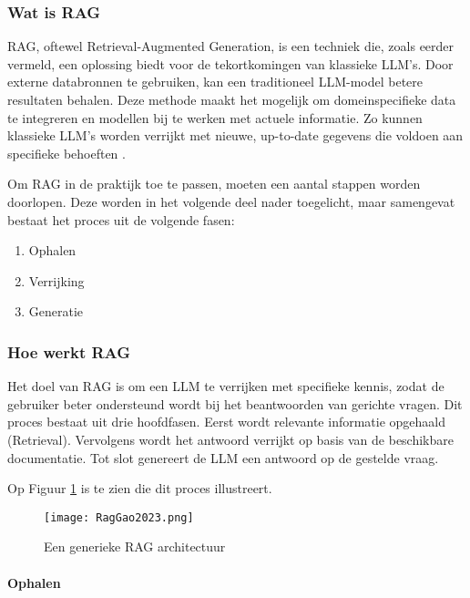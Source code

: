     \subsubsection{Wat is RAG}
    RAG, oftewel Retrieval-Augmented Generation, is een techniek die, zoals eerder vermeld, een oplossing biedt voor de tekortkomingen van klassieke LLM’s. Door externe databronnen te gebruiken, kan een traditioneel LLM-model betere resultaten behalen. Deze methode maakt het mogelijk om domeinspecifieke data te integreren en modellen bij te werken met actuele informatie. Zo kunnen klassieke LLM’s worden verrijkt met nieuwe, up-to-date gegevens die voldoen aan specifieke behoeften \autocite{Wu2024}.
    
    Om RAG in de praktijk toe te passen, moeten een aantal stappen worden doorlopen. Deze worden in het volgende deel nader toegelicht, maar samengevat bestaat het proces uit de volgende fasen:
    
    \begin{enumerate}
        \item {Ophalen}
        \item {Verrijking}
        \item {Generatie}
    \end{enumerate}
    
    \subsubsection{Hoe werkt RAG}
    
    Het doel van RAG is om een LLM te verrijken met specifieke kennis, zodat de gebruiker beter ondersteund wordt bij het beantwoorden van gerichte vragen. Dit proces bestaat uit drie hoofdfasen. Eerst wordt relevante informatie opgehaald (Retrieval). Vervolgens wordt het antwoord verrijkt op basis van de beschikbare documentatie. Tot slot genereert de LLM een antwoord op de gestelde vraag.
    
    Op Figuur \ref{fig:Rag process} is te zien die dit proces illustreert.
    
    \begin{figure}[H]
        \centering
        \texttt{[image: RagGao2023.png]}
        \caption{Een generieke RAG architectuur \cite{Gao2023}}
        \label{fig:Rag process}
    \end{figure}
    
    \paragraph{Ophalen}
     
